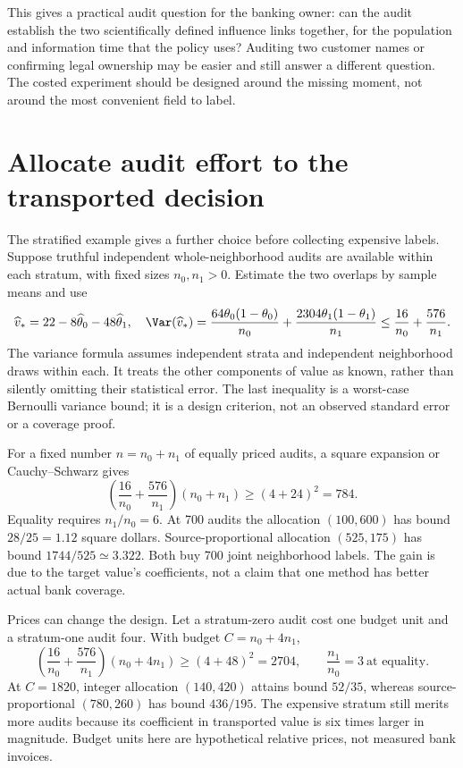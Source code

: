This gives a practical audit question for the banking owner: can the audit
establish the two scientifically defined influence links together, for the
population and information time that the policy uses? Auditing two customer
names or confirming legal ownership may be easier and still answer a different
question. The costed experiment should be designed around the missing moment,
not around the most convenient field to label.

\section{Allocate audit effort to the transported decision}
\label{exec17:s7-allocation}

The stratified example gives a further choice before collecting expensive
labels. Suppose truthful independent whole-neighborhood audits are available
within each stratum, with fixed sizes $n_0,n_1>0$. Estimate the two overlaps
by sample means and use
\begin{equation}
 \widehat v_*=22-8\widehat\theta_0-48\widehat\theta_1,
 \quad
 \Var(\widehat v_*)=
 \frac{64\theta_0(1-\theta_0)}{n_0}
 +\frac{2304\theta_1(1-\theta_1)}{n_1}
 \leq\frac{16}{n_0}+\frac{576}{n_1}.
 \label{exec17:s7-audit-variance}
\end{equation}
The variance formula assumes independent strata and independent neighborhood
draws within each. It treats the other components of value as known, rather
than silently omitting their statistical error. The last inequality is a
worst-case Bernoulli variance bound; it is a design criterion, not an observed
standard error or a coverage proof.

For a fixed number $n=n_0+n_1$ of equally priced audits, a square expansion or
Cauchy--Schwarz gives
\begin{equation}
 \left(\frac{16}{n_0}+\frac{576}{n_1}\right)(n_0+n_1)
 \geq(4+24)^2=784.
 \label{exec17:s7-audit-optimum}
\end{equation}
Equality requires $n_1/n_0=6$. At 700 audits the allocation $(100,600)$ has
bound $28/25=1.12$ square dollars. Source-proportional allocation $(525,175)$
has bound $1744/525\simeq3.322$. Both buy 700 joint neighborhood labels. The
gain is due to the target value's coefficients, not a claim that one method
has better actual bank coverage.~\citep{exec17_s7_math}

Prices can change the design. Let a stratum-zero audit cost one budget unit
and a stratum-one audit four. With budget $C=n_0+4n_1$,
\begin{equation}
 \left(\frac{16}{n_0}+\frac{576}{n_1}\right)(n_0+4n_1)
 \geq(4+48)^2=2704,
 \qquad \frac{n_1}{n_0}=3\ \text{at equality}.
 \label{exec17:s7-priced-optimum}
\end{equation}
At $C=1820$, integer allocation $(140,420)$ attains bound $52/35$, whereas
source-proportional $(780,260)$ has bound $436/195$. The expensive stratum
still merits more audits because its coefficient in transported value is six
times larger in magnitude. Budget units here are hypothetical relative prices,
not measured bank invoices.


